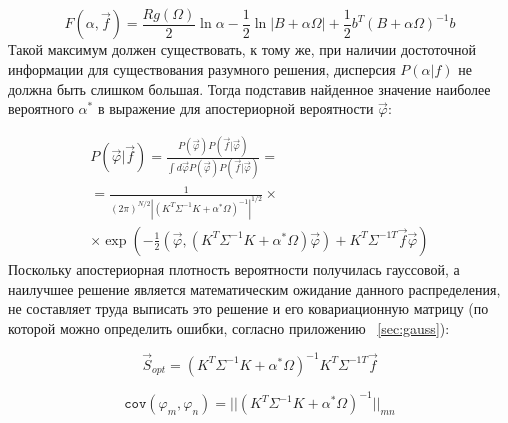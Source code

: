 \begin{equation}
	\label{eq:alphamax}
	F(\alpha,\vec{f}) = \frac{Rg(\Omega)}{2}\ln{\alpha} - \frac{1}{2}\ln{|B+\alpha\Omega|}  + \frac{1}{2}b^{T}(B+\alpha\Omega)^{-1}b
\end{equation}
Такой максимум должен существовать, к тому же, при наличии достоточной информации для существования разумного решения, дисперсия $P(\alpha|f)$ не должна быть слишком большая. Тогда подставив найденное значение наиболее вероятного $\alpha^*$ в выражение для апостериорной вероятности $\vec{\varphi}$:  
\begin{comment}Вообще говоря, наша выборка $\vec{f}$ не обязана содержать достаточно информации для существования наиболее вероятного $\alpha^*$. При обработке данных следует проверить этот факт, исследовав функцию \begin{equation}
	\label{eq:alphaaposter}
	P(\alpha|\vec{f}) = C \alpha^{\frac{Rg(\Omega)}{2}}\sqrt{|(B+\alpha\Omega)^{-1}|}\exp(-\frac{1}{2}b^{T}B^{-1}b)\exp(\frac{1}{2}b^{T}(B+\alpha\Omega)^{-1}b)
\end{equation}
Если же наше предположение оправдано, то подставим полученное $\alpha^*$ в выражение для апостериорной вероятности $\vec{\varphi}$:
\end{comment}

\begin{gather*}
	P(\vec{\varphi}|\vec{f})= \frac{P(\vec{\varphi})P(\vec{f}|\vec{\varphi})}{\int d\vec{\varphi}P(\vec{\varphi})P(\vec{f}|\vec{\varphi})} = \\
	=\frac{1}{(2\pi)^{N/2}|(K^T\Sigma^{-1}K+\alpha^*\Omega)^{-1}|^{1/2}} \times \\
	\times \exp(-\frac{1}{2} (\vec{\varphi},(K^T\Sigma^{-1}K + \alpha^*\Omega)\vec{\varphi}) + K^T\Sigma^{-1T}\vec{f}\vec{\varphi})
\end{gather*}
Поскольку апостериорная плотность вероятности получилась гауссовой, а наилучшее решение является математическим ожидание данного распределения, не составляет труда выписать это решение и его ковариационную матрицу (по которой можно определить ошибки, согласно приложению ~\ref{sec:gauss}):

\begin{equation} \label{eq:analit_solv}
	\vec{S}_{opt} = (K^T\Sigma^{-1}K+\alpha^*\Omega)^{-1}K^T\Sigma^{-1T}\vec{f}
\end{equation}

\begin{equation}
	\texttt{cov}(\varphi_m, \varphi_n) = ||(K^T\Sigma^{-1}K+\alpha^*\Omega)^{-1}||_{mn}
\end{equation}
